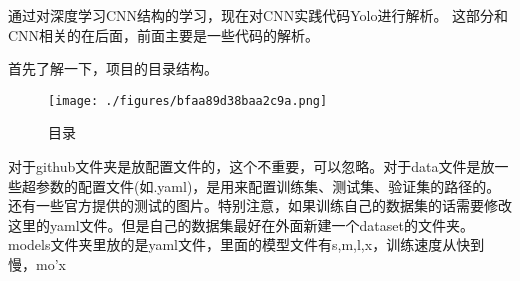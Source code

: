 

通过对深度学习CNN结构的学习，现在对CNN实践代码Yolo进行解析。
这部分和CNN相关的在后面，前面主要是一些代码的解析。

首先了解一下，项目的目录结构。\begin{figure}[ht]
\centering
\texttt{[image: ./figures/bfaa89d38baa2c9a.png]}
\caption{目录} \label{fig_yolov5_1}
\end{figure}
对于github文件夹是放配置文件的，这个不重要，可以忽略。对于data文件是放一些超参数的配置文件(如.yaml)，是用来配置训练集、测试集、验证集的路径的。还有一些官方提供的测试的图片。特别注意，如果训练自己的数据集的话需要修改这里的yaml文件。但是自己的数据集最好在外面新建一个dataset的文件夹。models文件夹里放的是yaml文件，里面的模型文件有s,m,l,x，训练速度从快到慢，mo'x
